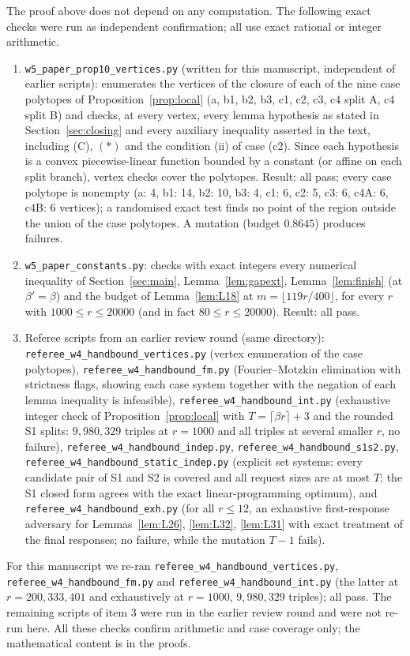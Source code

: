 \documentclass[11pt]{amsart}
\theoremstyle{definition}
\theoremstyle{remark}
\newcommand{\ceil}[1]{\lceil #1\rceil}
\newcommand{\floor}[1]{\lfloor #1\rfloor}
\begin{document}
The proof above does not depend on any computation. The following exact checks were run as independent confirmation; all use exact rational or integer arithmetic.
\begin{enumerate}
\item \texttt{w5\_paper\_prop10\_vertices.py} (written for this manuscript, independent of earlier scripts): enumerates the vertices of the closure of each of the nine case polytopes of Proposition~\ref{prop:local} (a, b1, b2, b3, c1, c2, c3, c4 split A, c4 split B) and checks, at every vertex, every lemma hypothesis as stated in Section~\ref{sec:closing} and every auxiliary inequality asserted in the text, including (C), $(*)$ and the condition (ii) of case (c2). Since each hypothesis is a convex piecewise-linear function bounded by a constant (or affine on each split branch), vertex checks cover the polytopes. Result: all pass; every case polytope is nonempty (a: 4, b1: 14, b2: 10, b3: 4, c1: 6, c2: 5, c3: 6, c4A: 6, c4B: 6 vertices); a randomised exact test finds no point of the region outside the union of the case polytopes. A mutation (budget $0.8645$) produces failures.
\item \texttt{w5\_paper\_constants.py}: checks with exact integers every numerical inequality of Section~\ref{sec:main}, Lemma~\ref{lem:gapext}, Lemma~\ref{lem:finish} (at $\beta'=\beta$) and the budget of Lemma~\ref{lem:L18} at $m=\floor{119r/400}$, for every $r$ with $1000\le r\le20000$ (and in fact $80\le r\le 20000$). Result: all pass.
\item Referee scripts from an earlier review round (same directory): \texttt{referee\_w4\_handbound\_vertices.py} (vertex enumeration of the case polytopes), \texttt{referee\_w4\_handbound\_fm.py} (Fourier--Motzkin elimination with strictness flags, showing each case system together with the negation of each lemma inequality is infeasible), \texttt{referee\_w4\_handbound\_int.py} (exhaustive integer check of Proposition~\ref{prop:local} with $T=\ceil{\beta r}+3$ and the rounded S1 splits: $9{,}980{,}329$ triples at $r=1000$ and all triples at several smaller $r$, no failure), \texttt{referee\_w4\_handbound\_indep.py}, \texttt{referee\_w4\_handbound\_s1s2.py}, \texttt{referee\_w4\_handbound\_static\_indep.py} (explicit set systems: every candidate pair of S1 and S2 is covered and all request sizes are at most $T$; the S1 closed form agrees with the exact linear-programming optimum), and \texttt{referee\_w4\_handbound\_exh.py} (for all $r\le12$, an exhaustive first-response adversary for Lemmas~\ref{lem:L26}, \ref{lem:L32}, \ref{lem:L31} with exact treatment of the final responses; no failure, while the mutation $T-1$ fails).
\end{enumerate}
For this manuscript we re-ran \texttt{referee\_w4\_handbound\_vertices.py}, \texttt{referee\_w4\_handbound\_fm.py} and \texttt{referee\_w4\_handbound\_int.py} (the latter at $r=200,333,401$ and exhaustively at $r=1000$, $9{,}980{,}329$ triples); all pass. The remaining scripts of item 3 were run in the earlier review round and were not re-run here. All these checks confirm arithmetic and case coverage only; the mathematical content is in the proofs.
\end{document}
